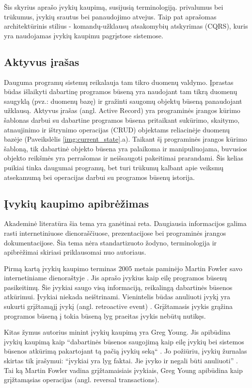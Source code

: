 Šis skyrius aprašo įvykių kaupimą, susijusią terminologiją. privalumus bei trūkumus, įvykių srautus bei panaudojimo atvejus. Taip pat aprašomas architektūrinis stilius - komandų-užklausų atsakomybių atskyrimas (CQRS), kuris yra naudojamas įvykių kaupimu pagrįstose sistemose. 

\subsection{Aktyvus įrašas}

Dauguma programų sistemų reikalauja tam tikro duomenų valdymo. Įprastas būdas išlaikyti dabartinę programos būseną yra naudojant tam tikrą duomenų saugyklą (pvz.: duomenų bazę) ir gražinti saugomų objektų būseną panaudojant užklausą. Aktyvus įrašas (angl. Active Record) yra programinės įrangos kūrimo šablonas darbui su dabartine programos būsena pritaikant sukūrimo, skaitymo, atnaujinimo ir ištrynimo operacijas (CRUD) objektams reliacinėje duomenų bazėje \cite{Fowler:2002:PEA:579257} (Paveikslėlis \ref{img:current_state}.a). Taikant šį programinės įrangos kūrimo šabloną, tik dabartinė objekto būsena yra palaikoma ir manipuliuojama, buvusios objekto reikšmės yra perrašomas ir neišsaugoti pakeitimai prarandami. Šis kelias puikiai tinka daugumai programų, bet turi trūkumų kalbant apie veiksmų atsekamumą bei operacijas darbui su programos būsenų istorija.

\subsection{Įvykių kaupimo apibrėžimas}

Akademinė literatūra šia tema yra ganėtinai reta. Daugiausia informacijos galima rasti internetiniuose dienoraščiuose, prezentacijose bei programinės įrangos dokumentacijose. Šia tema nėra standartizuoto žodyno, terminologija ir apibrėžimai skiriasi priklausomai nuo autoriaus.

Pirmą kartą įvykių kaupimo terminas 2005 metais paminėjo Martin Fowler savo internetiniame dienoraštyje \cite{Fowler:EventSourcing}. Jis aprašo įvykius kaip eilę programos būsenų pasikeitimų. Šie įvykiai saugo visą informaciją, reikalingą dabartinės būsenos atkūrimui. Įvykiai niekada neištrinami. Vienintelis būdas anuliuoti įvykį yra sukurti grįžtamąjį įvykį (angl. retroactive event) \cite{Fowler:RetroactiveEvent}. Grįžtamasis įvykis grąžina programos būseną į tokia būseną lyg praeitas įvykis nebūtų nutikęs.

Kitas žymus autorius minint įvykių kaupimą yra Greg Young. Jis apibūdina įvykių kaupimą kaip “dabartinės būsenos saugojimą kaip eilę įvykių bei sistemos būsenos atkūrimą pakartojant tą pačią įvykių seką“ \cite{Young:CQRS2010}. Jo požiūriu, įvykių žurnalas skirtas tik įrašymui: “įvykiai yra lyg faktai. Jie įvyko ir negali būti anuliuoti” \cite{Young:CQRS2013}. Tai ką Martin Fowler vadina grįžtamaisiais įvykiais, Greg Young apibūdina kaip grįžtamąsias operacijas (angl. reversal transactions).

